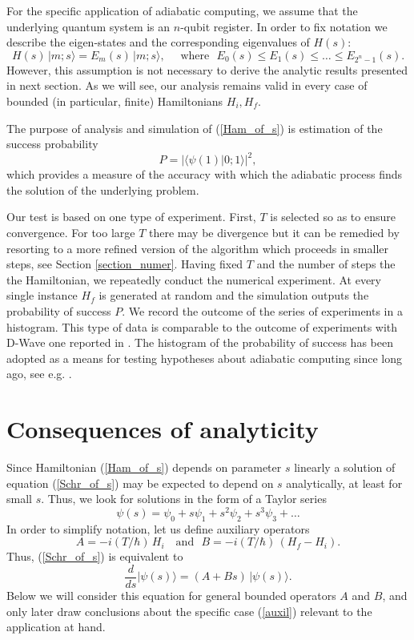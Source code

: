 \documentclass[11 pt]{article}
\begin{document}
For the specific application of adiabatic computing, we assume that the underlying quantum system is an $n$-qubit register. In order to fix notation we describe the eigen-states and the corresponding eigenvalues of $H(s)$:
\begin{equation}
H(s) \,|m;s\rangle = E_m(s)\,|m;s\rangle,\quad  \mbox{ where }\,\, E_0(s)\leq E_1(s) \leq \ldots \leq E_{2^n-1}(s).
\end{equation}
However, this assumption is not necessary to derive the analytic results presented in next section. As we will see, our analysis remains valid in every case of bounded (in particular, finite) Hamiltonians $H_i, H_f$.

The purpose of analysis and simulation of (\ref{Ham_of_s}) is estimation of the success probability
\begin{equation}\label{success}
P = |\langle \psi(1)| 0;1\rangle |^2,
\end{equation}
which provides a measure of the accuracy with which the adiabatic process finds the solution of the underlying problem.

Our test is based on one type of experiment. First,  $T$ is selected so as to ensure convergence. For too large $T$ there may be divergence but it can be remedied by resorting to a more refined version of the algorithm which proceeds in smaller steps, see Section \ref{section_numer}. Having fixed $T$ and the number of steps the the Hamiltonian, we repeatedly conduct the numerical experiment. At every single instance $H_f$ is generated at random and the simulation outputs the probability of success $P$. We record the outcome of the series of experiments in a histogram. This type of data is comparable to the outcome of experiments with D-Wave one reported in \cite{Boxio}. The histogram of the probability of success has been adopted as a means for testing hypotheses about adiabatic computing since long ago, see e.g. \cite{Farhi}.

\section{Consequences of analyticity}

Since Hamiltonian (\ref{Ham_of_s}) depends on parameter $s$ linearly a solution of equation (\ref{Schr_of_s}) may be expected to depend on $s$ analytically, at least for small $s$. Thus, we look for solutions in the form of a Taylor series
\begin{equation}\label{Ansatz}
\psi(s) = \psi_0 +s\psi_1 +s^2\psi_2 + s^3\psi_3+\ldots
\end{equation}
In order to simplify notation, let us define auxiliary operators
\begin{equation}\label{auxil}
A = -i(T/\hbar)\, H_i \quad \mbox{and }\,\, B=-i(T/\hbar)\,(H_f-H_i).
\end{equation}
Thus, (\ref{Schr_of_s}) is equivalent to
\begin{equation}\label{Schr_AB}
\frac{d}{ds} |\psi(s)\rangle= (A+Bs)\,|\psi(s)\rangle.
\end{equation}
Below we will consider this equation for general bounded operators $A$ and $B$, and only later draw conclusions about the specific case (\ref{auxil}) relevant to the application at hand.
\end{document}

